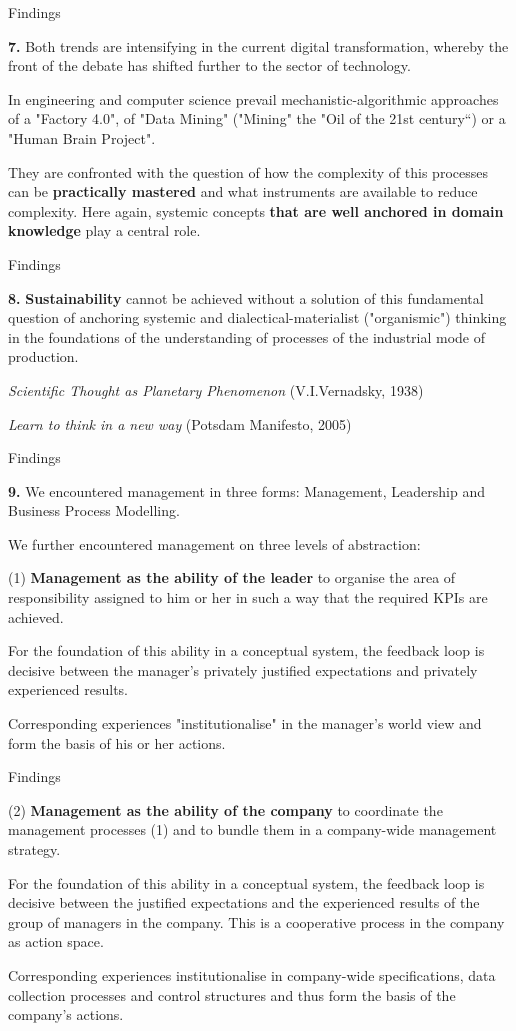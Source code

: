 \documentclass{beamer}
\begin{document}
\begin{frame}{Findings}

\textbf{7.}
Both trends are intensifying in the current digital transformation, whereby
the front of the debate has shifted further to the sector of technology.

In engineering and computer science prevail mechanistic-algorithmic approaches
of a "Factory 4.0", of "Data Mining" ("Mining" the "Oil of the 21st century“)
or a "Human Brain Project".

They are confronted with the question of how the complexity of this processes
can be \textbf{practically mastered} and what instruments are available to
reduce complexity. Here again, systemic concepts \textbf{that are well
  anchored in domain knowledge} play a central role.
\end{frame}
\begin{frame}{Findings}

\textbf{8.}
\textbf{Sustainability} cannot be achieved without a solution of this
fundamental question of anchoring systemic and dialectical-materialist
("organismic") thinking in the foundations of the understanding of processes
of the industrial mode of production.

\emph{Scientific Thought as Planetary Phenomenon} (V.I.Vernadsky, 1938)

\emph{Learn to think in a new way} (Potsdam Manifesto, 2005)
\end{frame}
\begin{frame}{Findings}

\textbf{9.}  We encountered management in three forms: Management, Leadership
and Business Process Modelling.

We further encountered management on three levels of abstraction:

(1) \textbf{Management as the ability of the leader} to organise the area of
responsibility assigned to him or her in such a way that the required KPIs are
achieved.

For the foundation of this ability in a conceptual system, the feedback loop
is decisive between the manager's privately justified expectations and
privately experienced results.

Corresponding experiences "institutionalise" in the manager's world view and
form the basis of his or her actions.

\end{frame}
\begin{frame}{Findings}

(2) \textbf{Management as the ability of the company} to coordinate the
management processes (1) and to bundle them in a company-wide management
strategy.

For the foundation of this ability in a conceptual system, the feedback loop
is decisive between the justified expectations and the experienced results of
the group of managers in the company.  This is a cooperative process in the
company as action space.

Corresponding experiences institutionalise in company-wide specifications,
data collection processes and control structures and thus form the basis of
the company's actions.

\end{frame}
\end{document}
